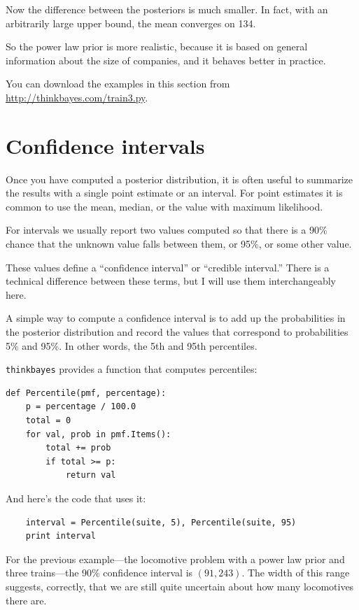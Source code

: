 \documentclass[12pt]{book}
\begin{document}
Now the difference between the posteriors is much smaller.  In fact,
with an arbitrarily large upper bound, the mean converges on 134.

So the power law prior is more realistic, because it is based on
general information about the size of companies, and it
behaves better in practice.

You can download the examples in this section from
\url{http://thinkbayes.com/train3.py}.

\section{Confidence intervals}

Once you have computed a posterior distribution, it is often useful
to summarize the results with a single point estimate or an interval.
For point estimates it is common to use the mean, median, or the
value with maximum likelihood.

For intervals we usually report two values computed
so that there is a 90\% chance that the unknown value falls
between them, or 95\%, or some other value.

These values define a ``confidence interval'' or ``credible interval.''
There is a technical difference between these terms, but I will
use them interchangeably here.

A simple way to compute a confidence interval is to add up the
probabilities in the posterior distribution and record the values
that correspond to probabilities 5\% and 95\%.  In other words,
the 5th and 95th percentiles.

\verb"thinkbayes" provides a function that computes percentiles:

\begin{verbatim}
def Percentile(pmf, percentage):
    p = percentage / 100.0
    total = 0
    for val, prob in pmf.Items():
        total += prob
        if total >= p:
            return val    
\end{verbatim}

And here's the code that uses it:

\begin{verbatim}
    interval = Percentile(suite, 5), Percentile(suite, 95)
    print interval
\end{verbatim}

For the previous example---the locomotive problem with a power law prior
and three trains---the 90\% confidence interval is $(91, 243)$.  The
width of this range suggests, correctly, that we are still quite
uncertain about how many locomotives there are.
\end{document}
